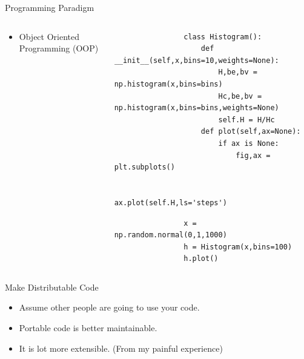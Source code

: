 \documentclass[aspectratio=169]{beamer}
\begin{document}
\begin{frame}[fragile]{Programming Paradigm}
     \begin{columns}
        \begin{column}{0.39\textwidth}
            \begin{itemize}
                \item Object Oriented Programming (OOP)
            \end{itemize}
        \end{column}
        \begin{column}{0.59\textwidth}

            \begin{verbatim}
                class Histogram():
                    def __init__(self,x,bins=10,weights=None):
                        H,be,bv = np.histogram(x,bins=bins)
                        Hc,be,bv = np.histogram(x,bins=bins,weights=None)
                        self.H = H/Hc
                    def plot(self,ax=None):
                        if ax is None:
                            fig,ax = plt.subplots()

                        ax.plot(self.H,ls='steps')
            \end{verbatim}

            \begin{verbatim}
                x = np.random.normal(0,1,1000)
                h = Histogram(x,bins=100)
                h.plot()
            \end{verbatim}
        \end{column}
    \end{columns}
\end{frame} 
%
%
%
%
\begin{frame}[fragile]{Make Distributable Code}
    \begin{itemize}
        \item Assume other people are going to use your code.
        \item Portable code is better maintainable.
        \item It is lot more extensible. (From my painful experience)
    \end{itemize}
\end{frame} 
%
%
%
%
\end{document}
